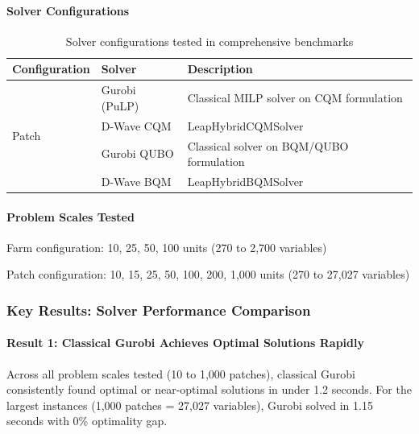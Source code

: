 \paragraph{Solver Configurations}

\begin{table}[H]
\centering
\caption{Solver configurations tested in comprehensive benchmarks}
\label{tab:solver_configs}
\begin{tabular}{llp{6cm}}
\toprule
\textbf{Configuration} & \textbf{Solver} & \textbf{Description} \\
\midrule
\multirow{4}{*}{Patch} & Gurobi (PuLP) & Classical MILP solver on CQM formulation \\
& D-Wave CQM & LeapHybridCQMSolver \\
& Gurobi QUBO & Classical solver on BQM/QUBO formulation \\
& D-Wave BQM & LeapHybridBQMSolver \\
\bottomrule
\end{tabular}
\end{table}

\paragraph{Problem Scales Tested}

Farm configuration: 10, 25, 50, 100 units (270 to 2,700 variables)

Patch configuration: 10, 15, 25, 50, 100, 200, 1,000 units (270 to 27,027 variables)

\subsubsection{Key Results: Solver Performance Comparison}

\paragraph{Result 1: Classical Gurobi Achieves Optimal Solutions Rapidly}

Across all problem scales tested (10 to 1,000 patches), classical Gurobi consistently found optimal or near-optimal solutions in under 1.2 seconds. For the largest instances (1,000 patches = 27,027 variables), Gurobi solved in 1.15 seconds with 0\% optimality gap.

